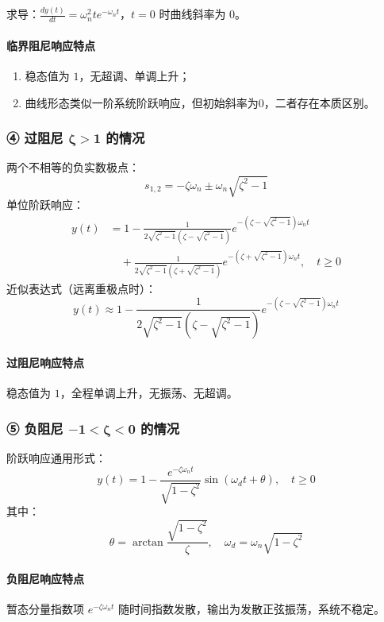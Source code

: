 求导：$\displaystyle \frac{dy(t)}{dt}=\omega_n^2 t e^{-\omega_n t}$，$t=0$ 时曲线斜率为 $0$。

\paragraph{临界阻尼响应特点}
\begin{enumerate}
    \item 稳态值为 $1$，无超调、单调上升；
    \item 曲线形态类似一阶系统阶跃响应，但初始斜率为0，二者存在本质区别。
\end{enumerate}

\subsubsection{④ 过阻尼 $\boldsymbol{\zeta>1}$ 的情况}
两个不相等的负实数极点：
\[
s_{1,2}=-\zeta\omega_n\pm\omega_n\sqrt{\zeta^2-1}
\]
单位阶跃响应：
\[
\begin{aligned}
y(t) &= 1-\frac{1}{2\sqrt{\zeta^2-1}\left(\zeta-\sqrt{\zeta^2-1}\right)}e^{-\left(\zeta-\sqrt{\zeta^2-1}\right)\omega_n t} \\
&\quad +\frac{1}{2\sqrt{\zeta^2-1}\left(\zeta+\sqrt{\zeta^2-1}\right)}e^{-\left(\zeta+\sqrt{\zeta^2-1}\right)\omega_n t},\quad t\ge0
\end{aligned}
\]
近似表达式（远离重极点时）：
\[
y(t) \approx 1-\frac{1}{2\sqrt{\zeta^2-1}\left(\zeta-\sqrt{\zeta^2-1}\right)}e^{-\left(\zeta-\sqrt{\zeta^2-1}\right)\omega_n t}
\]

\paragraph{过阻尼响应特点}
稳态值为 $1$，全程单调上升，无振荡、无超调。

\subsubsection{⑤ 负阻尼 $\boldsymbol{-1<\zeta<0}$ 的情况}
阶跃响应通用形式：
\[
y(t)=1-\frac{e^{-\zeta\omega_n t}}{\sqrt{1-\zeta^2}}\sin\left(\omega_d t+\theta\right),\quad t\ge0
\]
其中：
\[
\theta=\arctan\frac{\sqrt{1-\zeta^2}}{\zeta},\quad \omega_d=\omega_n\sqrt{1-\zeta^2}
\]

\paragraph{负阻尼响应特点}
暂态分量指数项 $e^{-\zeta\omega_n t}$ 随时间指数发散，输出为发散正弦振荡，系统不稳定。

